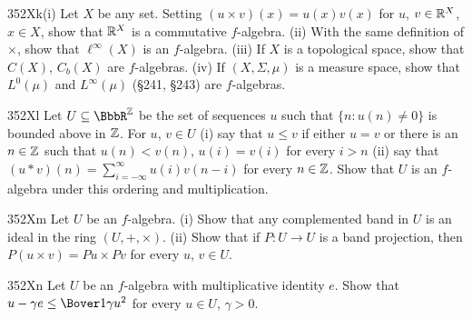 {\sqheader 352Xk(i) Let $X$ be any set.   Setting
$(u\times v)(x)=u(x)v(x)$ for $u$, $v\in\Bbb R^X$, $x\in X$, show that
$\Bbb R^X$
is a commutative $f$-algebra.   (ii) With the same definition of
$\times$, show
that $\ell^{\infty}(X)$ is an $f$-algebra.   (iii) If $X$ is a
topological space, show that $C(X)$, $C_b(X)$ are $f$-algebras.   (iv)
If $(X,\Sigma,\mu)$ is a measure space, show that $L^0(\mu)$ and
$L^{\infty}(\mu)$ (\S241, \S243) are $f$-algebras.
     
\spheader 352Xl  Let $U\subseteq\BbbR^{\Bbb Z}$ be the set of sequences
$u$ such that $\{n:u(n)\ne 0\}$ is bounded above in $\Bbb Z$.   For $u$,
$v\in U$ (i) say that $u\le v$ if either $u=v$ or there is an $n\in\Bbb
Z$ such that $u(n)<v(n)$, $u(i)=v(i)$ for every $i>n$ (ii) say that
$(u*v)(n)=\sum_{i=-\infty}^{\infty}u(i)v(n-i)$ for every $n\in\Bbb Z$.
Show that $U$ is an $f$-algebra under this ordering and multiplication.
     
\spheader 352Xm Let $U$ be an $f$-algebra.  (i) Show that any
complemented band in $U$
is an ideal in the ring $(U,+,\times)$.   (ii) Show that if $P:U\to U$
is a band projection, then $P(u\times v)=Pu\times Pv$ for every $u$,
$v\in U$.
     
\spheader 352Xn Let $U$ be an $f$-algebra with multiplicative identity
$e$.   Show that $u-\gamma e\le\Bover1{\gamma}u^2$ for every $u\in U$,
$\gamma>0$.   
     
}%
     
